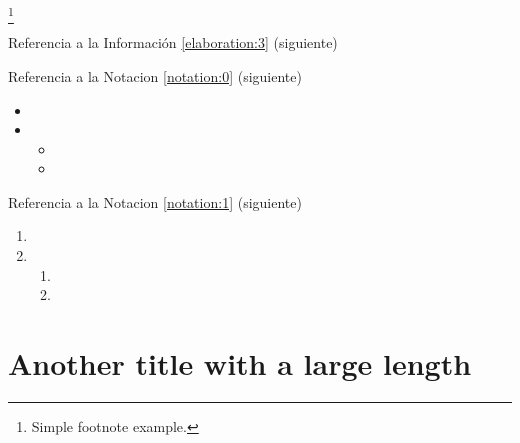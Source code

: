 \lipsum[1] %

\begin{attentionbox}
\label{attentionbox:a}
\lipsum[1][1-3]\footnote{Simple footnote example.}
\end{attentionbox}

\lipsum[1] %

Referencia a la Información \ref{elaboration:3} (siguiente)

\begin{elaboration}[Título C]
\label{elaboration:3}
\lipsum[1][1-3] 
\end{elaboration}

\lipsum[1][1-3] %


Referencia a la Notacion \ref{notation:0} (siguiente)

\begin{notation}[Título C]
\label{notation:0}
\lipsum[1][1-2]
\begin{itemize}
\item \lipsum[1][1-2]
\item \lipsum[1][1-2]
\begin{itemize}
\item \lipsum[1][1-2]
\item \lipsum[1][1-2]
\end{itemize}
\end{itemize}
\end{notation}

\lipsum[1][1-3] %

Referencia a la Notacion \ref{notation:1} (siguiente)

\begin{notation}[Título C]
\label{notation:1}
\lipsum[1][1-2]
\begin{enumerate}
\item \lipsum[1][1-2]
\item \lipsum[1][1-2]
\begin{enumerate}
\item \lipsum[1][1-2]
\item \lipsum[1][1-2]
\end{enumerate}
\end{enumerate}
\end{notation}

\section{Another title with a large length}


